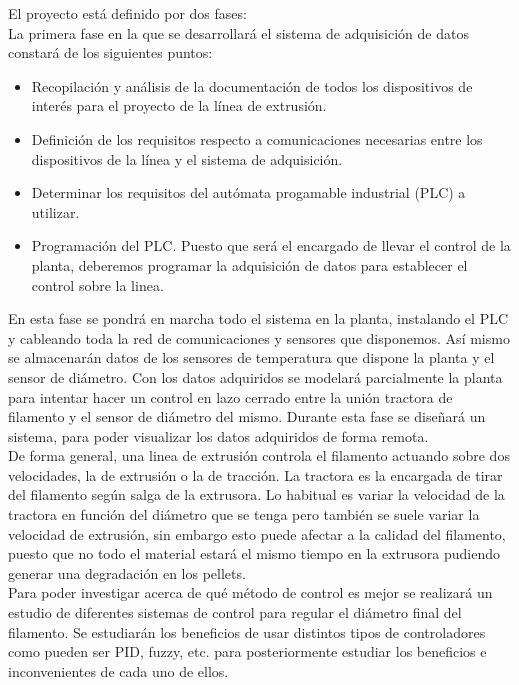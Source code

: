 El proyecto está definido por dos fases:\\

La primera fase en la que se desarrollará el sistema de adquisición de datos constará de los siguientes puntos:

\begin{itemize}
    \item Recopilación y análisis de la documentación de todos los dispositivos de interés para el proyecto de la línea de extrusión.
    \item Definición de los requisitos respecto a comunicaciones necesarias entre los dispositivos de la línea y el sistema de adquisición.
    \item Determinar los requisitos del autómata progamable industrial (PLC) a utilizar.
    \item Programación del PLC. Puesto que será el encargado de llevar el control de la planta, deberemos programar la adquisición de datos para establecer el control sobre la linea.
\end{itemize}

En esta fase se pondrá en marcha todo el sistema en la planta, instalando el PLC y cableando toda la red de comunicaciones y sensores que disponemos. Así mismo se almacenarán datos de los sensores de temperatura que dispone la planta y el sensor de diámetro. Con los datos adquiridos se modelará parcialmente la planta para intentar hacer un control en lazo cerrado entre la unión tractora de filamento y el sensor de diámetro del mismo. Durante esta fase se diseñará un sistema, para poder visualizar los datos adquiridos de forma remota.\\

De forma general, una linea de extrusión controla el filamento actuando sobre dos velocidades, la de extrusión o la de tracción. La tractora es la encargada de tirar del filamento según salga de la extrusora. Lo habitual es variar la velocidad de la tractora en función del diámetro que se tenga pero también se suele variar la velocidad de extrusión, sin embargo esto puede afectar a la calidad del filamento, puesto que no todo el material estará el mismo tiempo en la extrusora pudiendo generar una degradación en los pellets.\\

Para poder investigar acerca de qué método de control es mejor se realizará un estudio de diferentes sistemas de control para regular el diámetro final del filamento. Se estudiarán los beneficios de usar distintos tipos de controladores como pueden ser PID, fuzzy, etc. para posteriormente estudiar los beneficios e inconvenientes de cada uno de ellos.\\

